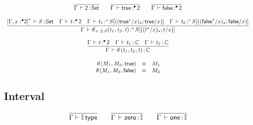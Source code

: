 \documentclass[11pt]{article}
\theoremstyle{plain}
\begin{document}
\[
\begin{array}{c}
\infer{\ofdtp{\Gamma}{\bool}{\types}}
      {}
\qquad
\infer{\oftpe{\Gamma}{\dsd{true}}{\bullet}{\bool}}{}
\qquad
\infer{\oftpe{\Gamma}{\dsd{false}}{\bullet}{\bool}}{}
\\ \\
\infer{\oftpe{\Gamma}{\ite{\tptm{x}{\dsd{2}}.S}{t_1}{t_2}{t}}{\vcond}{\tsubst{S}{\substdup{(t^\vcond/x)}{\vcond}{t/x}}}}
      {\ofdtp{\dupctx{\Gamma,\tpvar{x}{\bullet}{\dsd{2}}}{\vcond}}{S}{\types} &
        \oftpe{\Gamma}{t}{\bullet}{\dsd{2}} &
        \oftpe{\Gamma}{t_1}{\vcond}{\tsubst{S}{\substdup{(\dsd{true}^\vcond/x)}{\vcond}{\dsd{true}/x}}} &
        \oftpe{\Gamma}{t_2}{\vcond}{\tsubst{S}{\substdup{(\dsd{false}^\vcond/x)}{\vcond}{\dsd{false}/x}}}
      }
\\ \\
\infer{\oftp{\Gamma}{\ite{}{t_1}{t_2}{t}}{\C}}
      { \oftpe{\Gamma}{t}{\bullet}{\dsd{2}} &
        \ofdtp{\Gamma}{t_1}{\C} &
        \ofdtp{\Gamma}{t_2}{\C}
      }
\\ \\
\begin{array}{rcll}
\ite{}{M_1}{M_2}{\dsd{true}} & \equiv & M_1 \\
\ite{}{M_1}{M_2}{\dsd{false}} & \equiv & M_2 \\
\end{array} \\
\end{array}
\]

\subsection{Interval}

\[
\begin{array}{c}
\infer{\wftp{\Gamma}{\I}}
      {}
\qquad
\infer{\oftp{\Gamma}{\Iz}{\I}}{}
\qquad
\infer{\oftp{\Gamma}{\Io}{\I}}{}
\end{array}
\]
\end{document}
